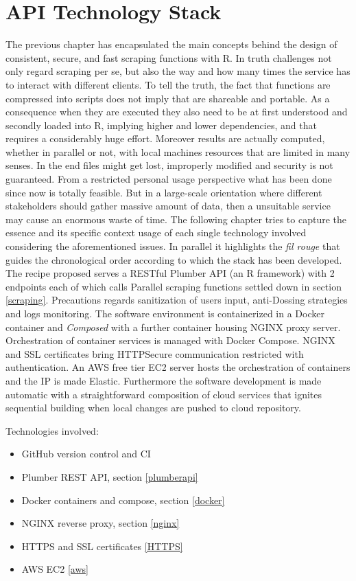 \documentclass[
  12pt,
  a4paper,
  oneside]{book}
\providecommand{\tightlist}{%
  \setlength{\itemsep}{0pt}\setlength{\parskip}{0pt}}
\theoremstyle{definition}
\theoremstyle{definition}
\theoremstyle{definition}
\theoremstyle{remark}
\begin{document}
\hypertarget{Infrastructure}{%
\chapter{API Technology Stack}\label{Infrastructure}}

The previous chapter has encapsulated the main concepts behind the design of consistent, secure, and fast scraping functions with R. In truth challenges not only regard scraping per se, but also the way and how many times the service has to interact with different clients. To tell the truth, the fact that functions are compressed into scripts does not imply that are shareable and portable. As a consequence when they are executed they also need to be at first understood and secondly loaded into R, implying higher and lower dependencies, and that requires a considerably huge effort. Moreover results are actually computed, whether in parallel or not, with local machines resources that are limited in many senses. In the end files might get lost, improperly modified and security is not guaranteed.
From a restricted personal usage perspective what has been done since now is totally feasible. But in a large-scale orientation where different stakeholders should gather massive amount of data, then a unsuitable service may cause an enormous waste of time.
The following chapter tries to capture the essence and its specific context usage of each single technology involved considering the aforementioned issues. In parallel it highlights the \emph{fil rouge} that guides the chronological order according to which the stack has been developed.
The recipe proposed serves a RESTful Plumber API (an R framework) with 2 endpoints each of which calls Parallel scraping functions settled down in section \ref{scraping}. Precautions regards sanitization of users input, anti-Dossing strategies and logs monitoring. The software environment is containerized in a Docker container and \emph{Composed} with a further container housing NGINX proxy server. Orchestration of container services is managed with Docker Compose. NGINX and SSL certificates bring HTTPSecure communication restricted with authentication. An AWS free tier EC2 server hosts the orchestration of containers and the IP is made Elastic. Furthermore the software development is made automatic with a straightforward composition of cloud services that ignites sequential building when local changes are pushed to cloud repository.

Technologies involved:

\begin{itemize}
\tightlist
\item
  GitHub version control and CI
\item
  Plumber REST API, section \ref{plumberapi}
\item
  Docker containers and compose, section \ref{docker}
\item
  NGINX reverse proxy, section \ref{nginx}
\item
  HTTPS and SSL certificates \ref{HTTPS}
\item
  AWS EC2 \ref{aws}
\end{itemize}
\end{document}
